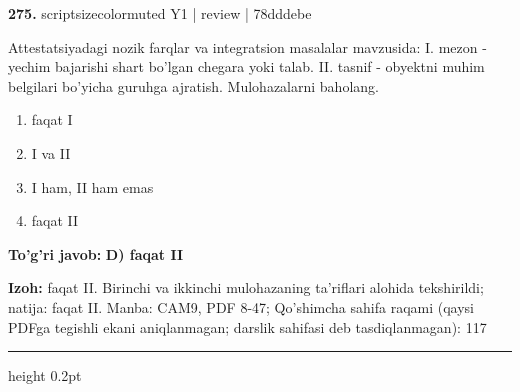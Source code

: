 \documentclass[10pt,a4paper]{article}
\begin{document}
{\bfseries\sffamily\color{ink} 275.} {scriptsizecolor{muted} Y1 | review | 78dddebe}
\par
Attestatsiyadagi nozik farqlar va integratsion masalalar mavzusida: I. mezon - yechim bajarishi shart bo'lgan chegara yoki talab. II. tasnif - obyektni muhim belgilari bo'yicha guruhga ajratish. Mulohazalarni baholang.
\begin{enumerate}[label=\Alph*),leftmargin=9mm]
\item faqat I
\item I va II
\item I ham, II ham emas
\item faqat II
\end{enumerate}
\begin{tcolorbox}[enhanced,breakable,colback=teal!4,colframe=teal!60!black,boxrule=0.45pt,arc=1.2mm,left=2.7mm,right=2.7mm,top=1.8mm,bottom=1.8mm,before skip=2mm,after skip=2mm]
{\bfseries\sffamily\color{teal}To'g'ri javob:} \textbf{D) faqat II}
\par\smallskip
{\bfseries Izoh:} faqat II. Birinchi va ikkinchi mulohazaning ta'riflari alohida tekshirildi; natija: faqat II. Manba: CAM9, PDF 8-47; Qo'shimcha sahifa raqami (qaysi PDFga tegishli ekani aniqlanmagan; darslik sahifasi deb tasdiqlanmagan): 117
\end{tcolorbox}
\vspace{2mm}\hrule height 0.2pt\vspace{3mm}
\end{document}
